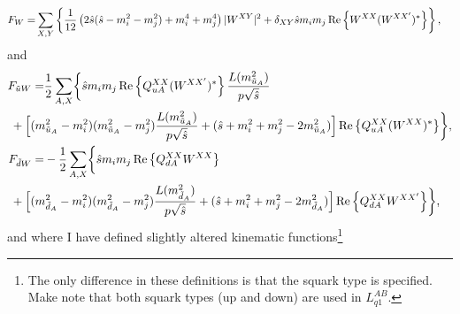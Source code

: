\documentclass[../main.tex]{subfiles}
\begin{document}
\begin{align}
  F_{W} = & \sum_{X,Y} \left\{\frac{1}{12} \left(2\hat{s}(\hat{s}-m_i^2-m_j^2) + m_i^4 + m_j^4\right) |W^{XY}|^2 + \delta_{XY} \hat{s}m_i m_j \operatorname{Re}\left\{W^{XX} (W^{XX^\prime})^\ast\right\}\right\},
\end{align}
and
\\
\begin{subequations}
  \begin{align}
    \nonumber
    F_{\tilde{u}W} = & \frac{1}{2} \sum_{A,X} \biggl\{
    \hat{s} m_i m_j \Re{Q_{uA}^{XX} (W^{XX^\prime})^\ast}\frac{L(m_{\tilde{u}_A}^2)}{p \sqrt{\hat{s}}}                                                                                                                              \\
                     & \hspace{-1cm}+ \Bigl[(m_{\tilde{u}_A}^2-m_i^2)(m_{\tilde{u}_A}^2-m_j^2) \frac{L(m_{\tilde{u}_A}^2)}{p \sqrt{\hat{s}}} + (\hat{s} + m_i^2 + m_j^2 - 2m_{\tilde{u}_A}^2)\Bigr] \Re{Q_{uA}^{XX}(W^{XX})^\ast}
    \biggr\},                                                                                                                                                                                                                       \\
    \nonumber
    F_{\tilde{d}W} = & -\frac{1}{2} \sum_{A,X} \biggl\{
    \hat{s} m_i m_j \Re{Q_{dA}^{XX} W^{XX}}                                                                                                                                                                                         \\
                     & \hspace{-1cm} + \Bigl[(m_{\tilde{d}_A}^2-m_i^2)(m_{\tilde{d}_A}^2-m_j^2) \frac{L(m_{\tilde{d}_A}^2)}{p \sqrt{\hat{s}}} + (\hat{s} + m_i^2 + m_j^2 - 2m_{\tilde{d}_A}^2) \Bigr]\Re{Q_{dA}^{XX} W^{XX^\prime}}
    \biggr\},
  \end{align}
\end{subequations}
and where I have defined slightly altered kinematic functions\footnote{The only difference in these definitions is that the squark type is specified. Make note that both squark types (up and down) are used in \(L_{q1}^{AB}\).}
\end{document}
